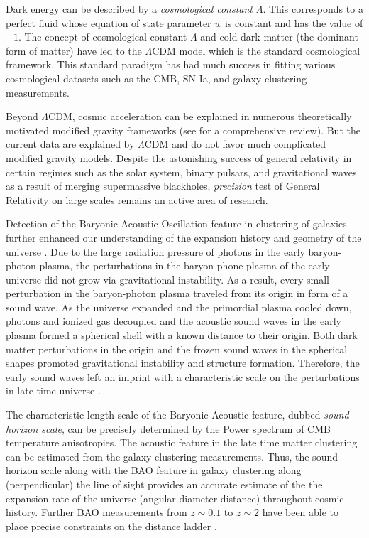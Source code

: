 Dark energy can be described by a \emph{cosmological constant} $\Lambda$. 
This corresponds to a perfect fluid whose equation of state parameter $w$ is 
constant and has the value of $-1$. The concept of cosmological constant $\Lambda$ and 
cold dark matter (the dominant form of matter) have led to the $\Lambda$CDM model which is 
the standard cosmological framework. This standard paradigm has had much success in 
fitting various cosmological datasets such as the CMB, SN Ia, and galaxy clustering 
measurements.

Beyond $\Lambda$CDM, cosmic acceleration 
can be explained in numerous theoretically motivated modified gravity frameworks (see \citealt{bull2016} 
for a comprehensive review). But the current data are explained by $\Lambda$CDM and do not favor 
much complicated modified gravity models. 
Despite the astonishing success of general relativity in 
certain regimes such as the solar system, binary pulsars, 
and gravitational waves as a result of merging supermassive blackholes, 
\emph{precision} test of General Relativity on large scales remains an active area of research. 

Detection of the Baryonic Acoustic Oscillation feature in clustering of galaxies 
further enhanced our understanding of the expansion history and geometry of the universe \citep{cole2005,eisenstein2005}.
Due to the large radiation pressure of photons in the early baryon-photon plasma, the perturbations in the 
baryon-phone plasma of the early universe did not grow via gravitational instability. As a result, every small perturbation 
in the baryon-photon plasma traveled from its origin in form of a sound wave. 
As the universe expanded and the primordial plasma cooled down, 
photons and ionized gas decoupled and the acoustic sound waves in the early plasma formed a spherical shell 
with a known distance to their origin. Both dark matter perturbations in the origin and the frozen sound waves in 
the spherical shapes promoted gravitational instability and structure formation. Therefore, the early sound waves left an 
imprint with a characteristic scale on the perturbations in late time universe \citep{eisenstein1998,weinberg2013}.  

The characteristic length scale of the Baryonic Acoustic feature, dubbed \emph{sound horizon scale}, 
can be precisely determined by the Power spectrum of CMB temperature anisotropies. 
The acoustic feature in the late time matter clustering can be estimated from 
the galaxy clustering measurements. Thus, the sound horizon scale along with the BAO feature in 
galaxy clustering along (perpendicular) the line of sight provides an accurate estimate 
of the the expansion rate of the universe (angular diameter distance) throughout cosmic history. Further BAO 
measurements from $z\sim0.1$ to $z\sim 2$ have been able to place precise constraints on the distance ladder \citep{percival2010,beutler2011,anderson2014,font2014,delubac2015,ross2015,alam2016}. 
 
